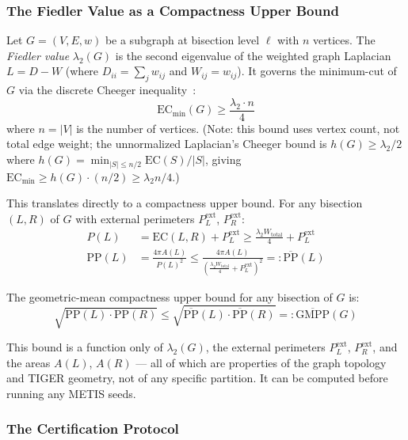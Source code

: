 \subsubsection{The Fiedler Value as a Compactness Upper Bound}

Let $G = (V, E, w)$ be a subgraph at bisection level $\ell$ with $n$ vertices.
The \emph{Fiedler value} $\lambda_2(G)$ is the second eigenvalue of the
weighted graph Laplacian $L = D - W$ (where $D_{ii} = \sum_j w_{ij}$ and
$W_{ij} = w_{ij}$). It governs the minimum-cut of $G$ via the discrete
Cheeger inequality~\citep{chung1997spectral}:
\[
  \mathrm{EC}_{\min}(G) \geq \frac{\lambda_2 \cdot n}{4}
\]
where $n = |V|$ is the number of vertices. (Note: this bound uses vertex
count, not total edge weight; the unnormalized Laplacian's Cheeger bound
is $h(G) \geq \lambda_2/2$ where $h(G) = \min_{|S|\leq n/2}
\mathrm{EC}(S)/|S|$, giving $\mathrm{EC}_{\min} \geq h(G)\cdot(n/2)
\geq \lambda_2 n/4$.)

This translates directly to a compactness upper bound. For any bisection
$(L, R)$ of $G$ with external perimeters $P_L^{\mathrm{ext}}$,
$P_R^{\mathrm{ext}}$:
\begin{align}
  P(L) &= \mathrm{EC}(L,R) + P_L^{\mathrm{ext}} \geq \frac{\lambda_2 W_{\mathrm{total}}}{4} + P_L^{\mathrm{ext}} \label{eq:plbound}\\
  \mathrm{PP}(L) &= \frac{4\pi A(L)}{P(L)^2} \leq \frac{4\pi A(L)}{\left(\frac{\lambda_2 W_{\mathrm{total}}}{4} + P_L^{\mathrm{ext}}\right)^2} =: \overline{\mathrm{PP}}(L) \label{eq:ppubound}
\end{align}

The geometric-mean compactness upper bound for any bisection of $G$ is:
\[
  \sqrt{\mathrm{PP}(L) \cdot \mathrm{PP}(R)} \leq \sqrt{\overline{\mathrm{PP}}(L) \cdot \overline{\mathrm{PP}}(R)} =: \overline{\mathrm{GMPP}}(G)
\]

This bound is a function only of $\lambda_2(G)$, the external perimeters
$P_L^{\mathrm{ext}}$, $P_R^{\mathrm{ext}}$, and the areas $A(L)$, $A(R)$
--- all of which are properties of the graph topology and TIGER geometry, not
of any specific partition. It can be computed before running any METIS seeds.

\subsubsection{The Certification Protocol}

